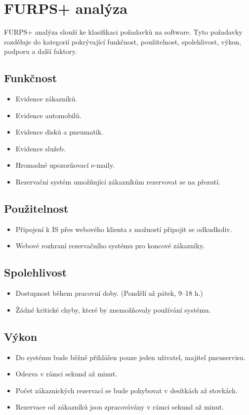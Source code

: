 \section{FURPS+ analýza}
FURPS+ analýza slouží ke klasifikaci požadavků na software. Tyto požadavky rozděluje do kategorií pokrývající funkčnost, použitelnost, spolehlivost, výkon, podporu a další faktory.
\subsection{Funkčnost}
\begin{itemize}
    \item Evidence zákazníků.
    \item Evidence automobilů.
    \item Evidence disků a pneumatik.
    \item Evidence služeb.
    \item Hromadné upozorňovací e-maily.
    \item Rezervační systém umožňující zákazníkům rezervovat se na přezutí.
\end{itemize}
\subsection{Použitelnost}
\begin{itemize}
    \item Připojení k IS přes webového klienta s možností připojit se odkudkoliv.
    \item Webové rozhraní rezervačního systému pro koncové zákazníky.
\end{itemize}
\subsection{Spolehlivost}
\begin{itemize}
    \item Dostupnost během pracovní doby. (Pondělí až pátek, 9--18 h.)
    \item Žádné kritické chyby, které by znemožňovaly používání systému.
\end{itemize}
\subsection{Výkon}
\begin{itemize}
    \item Do systému bude běžně přihlášen pouze jeden uživatel, majitel pneuservisu.
    \item Odezva v rámci sekund až minut. 
    \item Počet zákaznických rezervací se bude pohybovat v desítkách až stovkách.
    \item Rezervace od zákazníků jsou zpracovávány v rámci sekund až minut.
\end{itemize}
